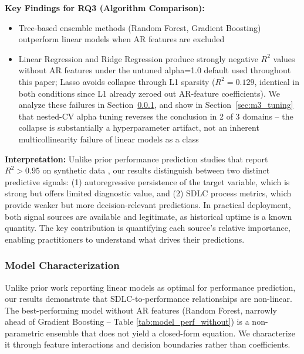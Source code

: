\documentclass[technologies,article,submit,pdftex,moreauthors]{Definitions/mdpi}
\begin{document}
\textbf{Key Findings for RQ3 (Algorithm Comparison):}

\begin{itemize}
\item
  Tree-based ensemble methods (Random Forest, Gradient Boosting)
  outperform linear models when AR features are excluded
\item
  Linear Regression and Ridge Regression produce strongly negative
  \(R^2\) values without AR features under the untuned alpha=1.0 default
  used throughout this paper; Lasso avoids collapse through L1 sparsity
  (\(R^2 = 0.129\), identical in both conditions since L1 already zeroed
  out AR-feature coefficients). We analyze these failures in Section~\ref{sec:model_char}, and show in Section~\ref{sec:m3_tuning} that nested-CV alpha tuning reverses
  the conclusion in 2 of 3 domains -- the collapse is substantially a
  hyperparameter artifact, not an inherent multicollinearity failure of
  linear models as a class
\end{itemize}

\textbf{Interpretation:} Unlike prior performance prediction studies
that report \(R^2 > 0.95\) on synthetic data \cite{ha2019}, our results
distinguish between two distinct predictive signals: (1) autoregressive
persistence of the target variable, which is strong but offers limited
diagnostic value, and (2) SDLC process metrics, which provide weaker but
more decision-relevant predictions. In practical deployment, both signal
sources are available and legitimate, as historical uptime is a known
quantity. The key contribution is quantifying each source's relative
importance, enabling practitioners to understand what drives their
predictions.

\subsubsection{Model Characterization}\label{sec:model_char}

Unlike prior work reporting linear models as optimal for performance
prediction, our results demonstrate that SDLC-to-performance
relationships are non-linear. The best-performing model without AR
features (Random Forest, narrowly ahead of Gradient Boosting -- Table
\ref{tab:model_perf_without}) is a non-parametric ensemble that does
not yield a closed-form equation. We characterize it through feature
interactions and decision boundaries rather than coefficients.
\end{document}
